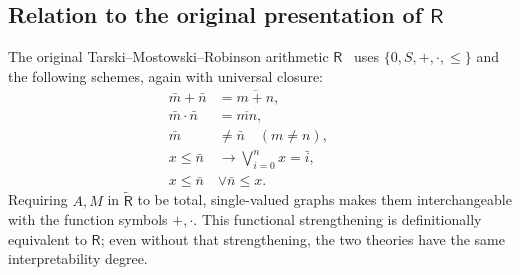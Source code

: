 \documentclass{article}
\theoremstyle{definition}
\theoremstyle{remark}
\newcommand{\Rt}{\widetilde{\mathsf R}}
\newcommand{\R}{\mathsf R}
\begin{document}
\subsection{Relation to the original presentation of
\texorpdfstring{$\R$}{R}}\label{sec:nonrelational}
The original Tarski--Mostowski--Robinson arithmetic
$\R$~\cite{tarski1953undecidable} uses
$\{0,S,+,\cdot,\le\}$ and the following schemes, again
with universal closure:
\begin{align}
    \bar m+\bar n&=\overline{m+n}, &&\tag{R1}\\
    \bar m\cdot\bar n&=\overline{mn}, &&\tag{R2}\\
    \bar m&\ne\bar n\quad(m\ne n), &&\tag{R3}\\
    x\le\bar n&\longrightarrow
        \bigvee_{i=0}^{n}x=\bar i,
        &&\tag{R4}\label{r:bound}\\
    x\le\bar n&\lor\bar n\le x.
        &&\tag{R5}\label{r:compare}
\end{align}
Requiring $A,M$ in $\Rt$ to be total, single-valued
graphs makes them interchangeable with the function
symbols $+,\cdot$. This functional strengthening is
definitionally equivalent to $\R$; even without that
strengthening, the two theories have the same
interpretability degree.
\end{document}
